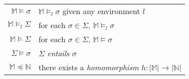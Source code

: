 \begin{tabular}{|r|l|}
		$\mathbb{M} \models \sigma$      &  $\mathbb{M} \models_l \sigma$ given any environment $l$                 \\
		$\mathbb{M} \models_l \Sigma$    &  for each $\sigma \in \Sigma$, $\mathbb{M} \models_l \sigma$             \\
		$\mathbb{M} \models \Sigma$      &  for each $\sigma \in \Sigma$, $\mathbb{M} \models \sigma$               \\
		\hline
		$\Sigma \models \sigma$          &  $\Sigma$ \emph{entails} $\sigma$                                        \\
		\hline
		$\mathbb{M} \preceq \mathbb{N}$  &  there exists a \emph{homomorphism} $h : |\mathbb{M}| \to |\mathbb{N}|$  \\
		\hline
	\end{tabular}
